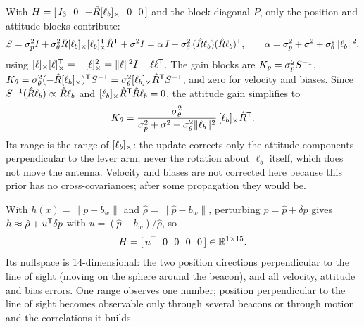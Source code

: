 \begin{solutions}
  \item With $H = [\,I_3\ \ 0\ \ {-\hat R[\ell_b]_{\times}}\ \ 0\ \ 0\,]$ and the block-diagonal $P$, only the position and attitude blocks contribute:
        \[
          S = \sigma_p^2I + \sigma_\theta^2\hat R[\ell_b]_{\times}[\ell_b]_{\times}^{\mathsf{T}}\hat R^{\mathsf{T}} + \sigma^2I = \alpha\,I - \sigma_\theta^2\,(\hat R\ell_b)(\hat R\ell_b)^{\mathsf{T}},
          \qquad \alpha = \sigma_p^2 + \sigma^2 + \sigma_\theta^2\|\ell_b\|^2,
        \]
        using $[\ell]_{\times}[\ell]_{\times}^{\mathsf{T}} = -[\ell]_{\times}^2 = \|\ell\|^2I - \ell\ell^{\mathsf{T}}$. The gain blocks are $K_p = \sigma_p^2S^{-1}$, $K_\theta = \sigma_\theta^2(-\hat R[\ell_b]_{\times})^{\mathsf{T}} S^{-1} = \sigma_\theta^2[\ell_b]_{\times}\hat R^{\mathsf{T}} S^{-1}$,
        and zero for velocity and biases. Since $S^{-1}(\hat R\ell_b) \propto \hat R\ell_b$ and $[\ell_b]_{\times}\hat R^{\mathsf{T}}\hat R\ell_b = 0$, the attitude gain simplifies to
        \[
          K_\theta = \frac{\sigma_\theta^2}{\sigma_p^2 + \sigma^2 + \sigma_\theta^2\|\ell_b\|^2}\,[\ell_b]_{\times}\hat R^{\mathsf{T}} .
        \]
        Its range is the range of $[\ell_b]_{\times}$: the update corrects only the attitude components perpendicular to the lever arm, never the rotation
        about $\ell_b$ itself, which does not move the antenna. Velocity and biases are not corrected here because this prior has no cross-covariances;
        after some propagation they would be.

  \item With $h(x) = \|p - b_w\|$ and $\hat\rho = \|\hat p - b_w\|$, perturbing $p = \hat p + \delta p$ gives $h \approx \hat\rho + u^{\mathsf{T}}\delta p$ with $u = (\hat p - b_w)/\hat\rho$, so
        \[
          H = [\,u^{\mathsf{T}}\ \ 0\ \ 0\ \ 0\ \ 0\,] \in \mathbb{R}^{1\times15} .
        \]
        Its nullspace is 14-dimensional: the two position directions perpendicular to the line of sight (moving on the sphere around the beacon), and
        all velocity, attitude and bias errors. One range observes one number; position perpendicular to the line of sight becomes observable only
        through several beacons or through motion and the correlations it builds.


\end{solutions}
